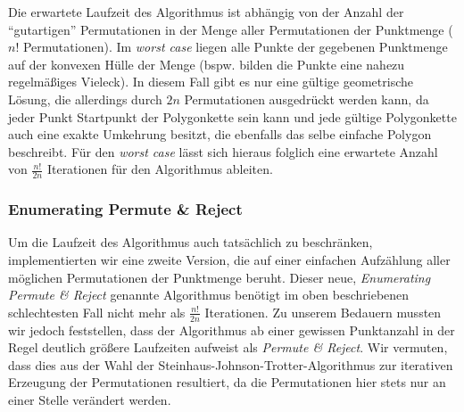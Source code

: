     Die erwartete Laufzeit des Algorithmus ist abhängig von der Anzahl der \enquote{gutartigen} 
    Permutationen in der Menge aller Permutationen der Punktmenge ($n!$ Permutationen). 
    Im \emph{worst case} liegen alle Punkte der gegebenen Punktmenge
    auf der konvexen Hülle der Menge (bspw. bilden die Punkte eine nahezu regelmäßiges
    Vieleck). In diesem Fall gibt es nur eine gültige geometrische Lösung, die allerdings
    durch $2n$ Permutationen ausgedrückt werden kann, da jeder Punkt Startpunkt der Polygonkette
    sein kann und jede gültige Polygonkette auch eine exakte Umkehrung besitzt, die ebenfalls
    das selbe einfache Polygon beschreibt. Für den \emph{worst case} lässt sich hieraus 
    folglich eine erwartete Anzahl von $\frac{n!}{2n}$ Iterationen für den Algorithmus ableiten.

  \subsubsection{Enumerating Permute \& Reject}

    Um die Laufzeit des Algorithmus auch tatsächlich zu beschränken, implementierten wir
    eine zweite Version, die auf einer einfachen Aufzählung aller möglichen Permutationen
    der Punktmenge beruht. Dieser neue, \emph{Enumerating Permute \& Reject} genannte Algorithmus
    benötigt im oben beschriebenen schlechtesten Fall nicht mehr als $\frac{n!}{2n}$ Iterationen.
    Zu unserem Bedauern mussten wir jedoch feststellen, dass der Algorithmus ab einer gewissen
    Punktanzahl in der Regel deutlich größere Laufzeiten aufweist als \emph{Permute \& Reject}.
    Wir vermuten, dass dies aus der Wahl der Steinhaus-Johnson-Trotter-Algorithmus zur iterativen 
    Erzeugung der Permutationen resultiert, da die Permutationen hier stets nur an einer Stelle
    verändert werden.
  